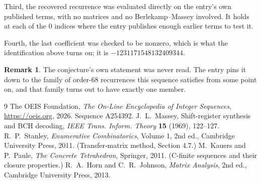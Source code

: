 \documentclass[11pt,a4paper]{article}
\theoremstyle{plain}
\theoremstyle{definition}
\newtheorem{remark}[theorem]{Remark}
\begin{document}
Third, the recovered recurrence was evaluated directly on the entry's own published terms, with
no matrices and no Berlekamp--Massey involved. It holds at each of the $0$ indices where
the entry publishes enough earlier terms to test it.

Fourth, the last coefficient was checked to be nonzero, which is what the identification above
turns on; it is $-1231171548132409344$.

\begin{remark}
The conjecture's own statement was never read. The entry pins it down to the family of
order-$68$ recurrences this sequence satisfies from some point on, and that family turns
out to have exactly one member.
\end{remark}

\begin{thebibliography}{9}
 The OEIS Foundation, \emph{The On-Line Encyclopedia of Integer
Sequences}, \url{https://oeis.org}, 2026. Sequence A254392.
 J.~L.~Massey, Shift-register synthesis and BCH decoding, \emph{IEEE
Trans. Inform. Theory} \textbf{15} (1969), 122--127.
 R.~P.~Stanley, \emph{Enumerative Combinatorics}, Volume 1, 2nd ed.,
Cambridge University Press, 2011. (Transfer-matrix method, Section 4.7.)
 M.~Kauers and P.~Paule, \emph{The Concrete Tetrahedron}, Springer, 2011.
(C-finite sequences and their closure properties.)
 R.~A.~Horn and C.~R.~Johnson, \emph{Matrix Analysis}, 2nd ed., Cambridge
University Press, 2013.
\end{thebibliography}
\end{document}
